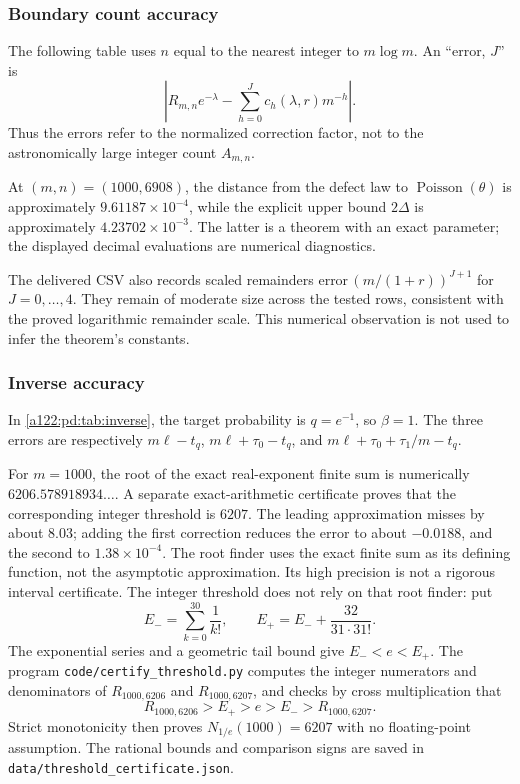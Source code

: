 \documentclass[11pt,letterpaper]{article}
\numberwithin{equation}{subsection}
\theoremstyle{definition}
\theoremstyle{remark}
\theoremstyle{plain}
\newcommand{\Poi}{\operatorname{Poisson}}
\begin{document}
\subsubsection{Boundary count accuracy}
The following table uses $n$ equal to the nearest integer to $m\log m$.
An ``error, $J$'' is
\[
 \left|R_{m,n}e^{-\lambda}-\sum_{h=0}^J
                 c_h(\lambda,r)m^{-h}\right|.
\]
Thus the errors refer to the normalized correction factor, not to the
astronomically large integer count $A_{m,n}$.
\begin{table}[H]
\centering\small

\caption{Boundary expansion errors computed with 80-decimal-digit arithmetic.}
\label{a122:pd:tab:critical}
\end{table}
At $(m,n)=(1000,6908)$, the distance from the defect law to
$\Poi(\theta)$ is approximately $9.61187\times10^{-4}$, while the
explicit upper bound $2\Delta$ is approximately
$4.23702\times10^{-3}$. The latter is a theorem with an exact parameter;
the displayed decimal evaluations are numerical diagnostics.

The delivered CSV also records scaled remainders
$\text{error}\,(m/(1+r))^{J+1}$ for $J=0,\ldots,4$.
They remain of moderate size across the tested rows, consistent with the
proved logarithmic remainder scale. This numerical observation is not
used to infer the theorem's constants.

\subsubsection{Inverse accuracy}
In \cref{a122:pd:tab:inverse}, the target probability is $q=e^{-1}$, so
$\beta=1$. The three errors are respectively
$m\ell-t_q$, $m\ell+\tau_0-t_q$, and
$m\ell+\tau_0+\tau_1/m-t_q$.
\begin{table}[H]
\centering\small
\setlength{\tabcolsep}{4pt}

\caption{Inverting the exact real-exponent finite sum at target $q=e^{-1}$.}
\label{a122:pd:tab:inverse}
\end{table}
For $m=1000$, the root of the exact real-exponent finite sum is numerically
$6206.578918934\ldots$. A separate exact-arithmetic certificate proves
that the corresponding integer threshold is $6207$. The leading approximation misses by about $8.03$; adding the
first correction reduces the error to about $-0.0188$, and the second
to $1.38\times10^{-4}$.
The root finder uses the exact finite sum as its defining function,
not the asymptotic approximation. Its high precision is not a rigorous
interval certificate. The integer threshold does not rely on that root
finder: put
\[
 E_- =\sum_{k=0}^{30}\frac1{k!},\qquad
 E_+=E_-+\frac{32}{31\cdot31!}.
\]
The exponential series and a geometric tail bound give $E_-<e<E_+$.
The program \nolinkurl{code/certify_threshold.py} computes the integer
numerators and denominators of $R_{1000,6206}$ and $R_{1000,6207}$,
and checks by cross multiplication that
\[
 R_{1000,6206}>E_+>e>E_->R_{1000,6207}.
\]
Strict monotonicity then proves $N_{1/e}(1000)=6207$ with no floating-point
assumption. The rational bounds and comparison signs are saved in
\texttt{data/threshold\_certificate.json}.
\end{document}
